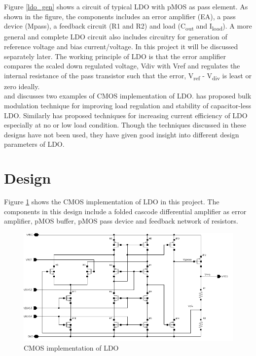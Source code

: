 \documentclass[12pt,a4paper,UKenglish]{report}
\begin{document}
Figure \ref{ldo_gen} shows a circuit of typical LDO with pMOS as pass element. As shown in the figure, the 
components includes an error amplifier (EA), a pass device (Mpass), a feedback circuit (R1 and R2) and load 
(C\textsubscript{out} and I\textsubscript{load}). A more general and complete LDO circuit also includes 
circuitry for generation of reference voltage and bias current/voltage. In this project it will be discussed 
separately later. The working principle of LDO is that the error amplifier compares the scaled down regulated 
voltage, Vdiv with Vref and regulates the internal resistance of the pass transistor such that  the error, 
V\textsubscript{ref} - V\textsubscript{div} is least or zero ideally. \\

\cite{ldo_bulkmod} and \cite{ldo_quiescent} discusses two examples of CMOS implementation of LDO. \cite{ldo_bulkmod} 
has proposed bulk modulation technique for improving load regulation and stability of capacitor-less LDO. 
Similarly \cite{ldo_quiescent} has  proposed techniques for increasing current efficiency of LDO especially at 
no or low load condition. Though the techniques discussed in these designs have not been used, they have given 
good insight into different design parameters of LDO.  \\

\section{Design}		%

Figure \ref{fig:ldo_cmos} shows the CMOS implementation of LDO in this project. The components in this design 
include a folded cascode differential amplifier as error amplifier, pMOS buffer, pMOS pass device and feedback 
network of resistors. \\

\begin{figure}[htbp] %
   \centering
  \includegraphics[width=\textwidth]{img/ldo_schematic.pdf} 
   \caption{CMOS implementation of LDO}
   \label{fig:ldo_cmos}
\end{figure}
\end{document}

